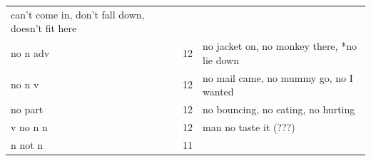 \documentclass[man,floatsintext,draftall]{apa6}
\begin{document}
\begin{longtable}[]{@{}lll@{}}
\begin{minipage}[t]{0.47\columnwidth}
can't come in, don't fall down, doesn't fit here\strut
\end{minipage}\tabularnewline
\begin{minipage}[t]{0.23\columnwidth}\raggedright\strut
no n adv\strut
\end{minipage} & \begin{minipage}[t]{0.15\columnwidth}\raggedright\strut
12\strut
\end{minipage} & \begin{minipage}[t]{0.47\columnwidth}\raggedright\strut
no jacket on, no monkey there, *no lie down\strut
\end{minipage}\tabularnewline
\begin{minipage}[t]{0.23\columnwidth}\raggedright\strut
no n v\strut
\end{minipage} & \begin{minipage}[t]{0.15\columnwidth}\raggedright\strut
12\strut
\end{minipage} & \begin{minipage}[t]{0.47\columnwidth}\raggedright\strut
no mail came, no mummy go, no I wanted\strut
\end{minipage}\tabularnewline
\begin{minipage}[t]{0.23\columnwidth}\raggedright\strut
no part\strut
\end{minipage} & \begin{minipage}[t]{0.15\columnwidth}\raggedright\strut
12\strut
\end{minipage} & \begin{minipage}[t]{0.47\columnwidth}\raggedright\strut
no bouncing, no eating, no hurting\strut
\end{minipage}\tabularnewline
\begin{minipage}[t]{0.23\columnwidth}\raggedright\strut
v no n n\strut
\end{minipage} & \begin{minipage}[t]{0.15\columnwidth}\raggedright\strut
12\strut
\end{minipage} & \begin{minipage}[t]{0.47\columnwidth}\raggedright\strut
man no taste it (???)\strut
\end{minipage}\tabularnewline
\begin{minipage}[t]{0.23\columnwidth}\raggedright\strut
n not n\strut
\end{minipage} & \begin{minipage}[t]{0.15\columnwidth}\raggedright\strut
11\strut
\end{minipage} & \begin{minipage}[t]{0.47\columnwidth}\raggedright\strut

\end{minipage}
\end{longtable}
\end{document}
